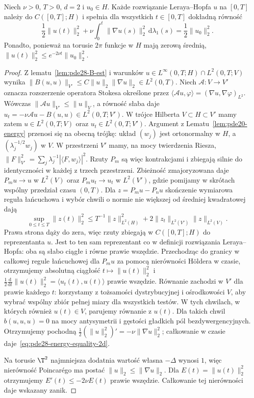 \begin{twierdzenie}
\label{thm:pde28-energy-equality-2d}
Niech $\nu>0$, $T>0$, $d=2$ i $u_0\in H$.
Każde rozwiązanie Leraya--Hopfa $u$ na $[0,T]$
należy do $C([0,T];H)$ i spełnia dla wszystkich
$t\in[0,T]$ dokładną równość
\begin{equation}\label{eq:pde28-energy-equality-2d}
 \frac12\|u(t)\|_2^2+
 \nu\int_0^t\|\nabla u(s)\|_2^2\,\mathrm d\lambda_1(s)
 =\frac12\|u_0\|_2^2.
\end{equation}
Ponadto, ponieważ na torusie $2\pi$ funkcje w $H$
mają zerową średnią,
$\|u(t)\|_2^2\le e^{-2\nu t}\|u_0\|_2^2$.
\end{twierdzenie}
\begin{proof}
Z lematu~\ref{lem:pde28-B-est} i warunków
$u\in L^\infty(0,T;H)\cap L^2(0,T;V)$ wynika
$\|B(u,u)\|_{V'}\le C\|u\|_2\|\nabla u\|_2\in
L^2(0,T)$. Niech $\mathcal A:V\to V'$ oznacza rozszerzenie
operatora Stokesa określone przez
$\langle\mathcal Au,\varphi\rangle=
(\nabla u,\nabla\varphi)_{L^2}$.
Wówczas $\|\mathcal Au\|_{V'}\le\|u\|_V$,
a równość słaba daje
$u_t=-\nu\mathcal Au-B(u,u)\in L^2(0,T;V')$.
W trójce Hilberta $V\subset H\subset V'$ mamy
zatem $u\in L^2(0,T;V)$ oraz $u_t\in L^2(0,T;V')$.
Argument z Lematu~\ref{lem:pde20-energy} przenosi się
na obecną trójkę: układ $(w_j)$ jest ortonormalny
w $H$, a $(\lambda_j^{-1/2}w_j)$ w $V$.
W przestrzeni $V'$ mamy, na mocy twierdzenia Riesza,
$\|F\|_{V'}^2=\sum_j\lambda_j^{-1}
|\langle F,w_j\rangle|^2$. Rzuty $P_m$ są więc
kontrakcjami i zbiegają silnie do identyczności
w każdej z trzech przestrzeni.
Zbieżność zmajoryzowana daje $P_mu\to u$ w $L^2(V)$
oraz $P_mu_t\to u_t$ w $L^2(V')$, gdzie pomijamy
w skrótach wspólny przedział czasu $(0,T)$.
Dla $z=P_mu-P_nu$ skończenie wymiarowa reguła
łańcuchowa i wybór chwili o normie nie większej
od średniej kwadratowej dają
\[
 \sup_{0\le t\le T}\|z(t)\|_2^2
 \le T^{-1}\|z\|_{L^2(H)}^2+
 2\|z_t\|_{L^2(V')}\|z\|_{L^2(V)}.
\]
Prawa strona dąży do zera, więc rzuty zbiegają
w $C([0,T];H)$ do reprezentanta $u$.
Jest to ten sam reprezentant co w definicji
rozwiązania Leraya--Hopfa: oba są słabo ciągłe
i równe prawie wszędzie.
Przechodząc do granicy w całkowej regule
łańcuchowej dla $P_mu$ za pomocą nierówności
Höldera w czasie, otrzymujemy absolutną ciągłość
$t\mapsto\|u(t)\|_2^2$ i
$\frac12\frac{\mathrm d}{\mathrm dt}\|u(t)\|_2^2
=\langle u_t(t),u(t)\rangle$ prawie wszędzie.
Równanie zachodzi w $V'$ dla prawie każdego $t$:
korzystamy z tożsamości dystrybucyjnej i ośrodkowości
$V$, aby wybrać wspólny zbiór pełnej miary dla
wszystkich testów. W tych chwilach, w których
również $u(t)\in V$, parujemy równanie z $u(t)$.
Dla takich chwil $b(u,u,u)=0$ na mocy
antysymetrii i gęstości gładkich pól bezdywergencyjnych.
Otrzymujemy pochodną
$\frac12(\|u\|_2^2)'=-\nu\|\nabla u\|_2^2$;
całkowanie w czasie daje~\eqref{eq:pde28-energy-equality-2d}.

Na torusie $\T^2$ najmniejsza dodatnia wartość
własna $-\Delta$ wynosi $1$, więc nierówność
Poincarégo ma postać $\|u\|_2\le\|\nabla u\|_2$.
Dla $E(t)=\|u(t)\|_2^2$ otrzymujemy
$E'(t)\le-2\nu E(t)$ prawie wszędzie.
Całkowanie tej nierówności daje wskazany zanik.
\end{proof}

